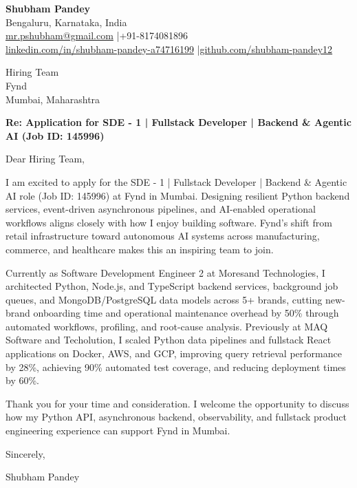 \documentclass[a4paper,11pt]{article}
\begin{document}
\textbf{Shubham Pandey} \\
Bengaluru, Karnataka, India \\
\href{mailto:mr.pshubham@gmail.com}{mr.pshubham@gmail.com} \quad|\quad +91-8174081896 \\
\href{https://www.linkedin.com/in/shubham-pandey-a74716199/}{linkedin.com/in/shubham-pandey-a74716199} \quad|\quad \href{https://github.com/shubham-pandey12}{github.com/shubham-pandey12}

\vspace{1em}

Hiring Team \\
Fynd \\
Mumbai, Maharashtra

\vspace{1em}

\textbf{Re: Application for SDE - 1 | Fullstack Developer | Backend \& Agentic AI (Job ID: 145996)}

Dear Hiring Team,

I am excited to apply for the SDE - 1 | Fullstack Developer | Backend \& Agentic AI role (Job ID: 145996) at Fynd in Mumbai. Designing resilient Python backend services, event-driven asynchronous pipelines, and AI-enabled operational workflows aligns closely with how I enjoy building software. Fynd's shift from retail infrastructure toward autonomous AI systems across manufacturing, commerce, and healthcare makes this an inspiring team to join.

Currently as Software Development Engineer 2 at Moresand Technologies, I architected Python, Node.js, and TypeScript backend services, background job queues, and MongoDB/PostgreSQL data models across 5+ brands, cutting new-brand onboarding time and operational maintenance overhead by 50\% through automated workflows, profiling, and root-cause analysis. Previously at MAQ Software and Techolution, I scaled Python data pipelines and fullstack React applications on Docker, AWS, and GCP, improving query retrieval performance by 28\%, achieving 90\% automated test coverage, and reducing deployment times by 60\%.

Thank you for your time and consideration. I welcome the opportunity to discuss how my Python API, asynchronous backend, observability, and fullstack product engineering experience can support Fynd in Mumbai.

\vspace{1em}

Sincerely,

Shubham Pandey
\end{document}
